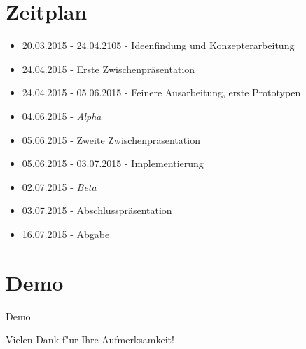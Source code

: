 \documentclass[landscape,compress,table]{beamer}
\begin{document}
\section{Zeitplan}
\begin{frame}
	\begin{itemize}
		\item 20.03.2015 - 24.04.2105 - Ideenfindung und Konzepterarbeitung
		\item 24.04.2015 - Erste Zwischenpräsentation
		\item 24.04.2015 - 05.06.2015 - Feinere Ausarbeitung, erste Prototypen
		\item 04.06.2015 - \emph{Alpha}
		\item 05.06.2015 - Zweite Zwischenpräsentation
		\item 05.06.2015 - 03.07.2015 - Implementierung
		\item 02.07.2015 - \emph{Beta}
		\item 03.07.2015 - Abschlusspräsentation
		\item 16.07.2015 - Abgabe
	\end{itemize}
\end{frame}

\section{Demo}
\begin{frame}
	\begin{center}
		Demo
	\end{center}
\end{frame}

\begin{frame}
	\begin{center}
		Vielen Dank f"ur Ihre Aufmerksamkeit!
	\end{center}
\end{frame}
\end{document}
